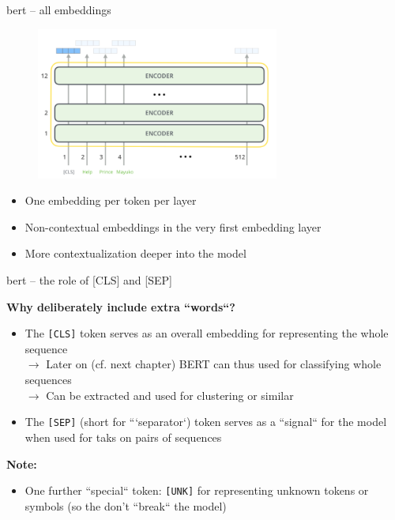 
\begin{frame}{bert -- all embeddings}

\vfill

\begin{figure}
	\centering
	\includegraphics[width = 8cm]{figure/bert-embedings.png}\\ 
\end{figure}

\begin{itemize}
	\item One embedding per token per layer
	\item Non-contextual embeddings in the very first embedding layer
	\item More contextualization deeper into the model
\end{itemize}

\vfill

\end{frame}


\begin{frame}{bert -- the role of [CLS] and [SEP]}

\vfill

\textbf{Why deliberately include extra ``words``?}

\begin{itemize}
	\item The \texttt{[CLS]} token serves as an overall embedding for representing the whole sequence\\
				$\to$ Later on (cf. next chapter) BERT can thus used for classifying whole sequences\\
				$\to$ Can be extracted and used for clustering or similar
	\item The \texttt{[SEP]} (short for ```separator`) token serves as a ``signal`` for the model when used for taks on pairs of sequences
\end{itemize}

\textbf{Note:}

\begin{itemize}
	\item One further ``special`` token: \texttt{[UNK]} for representing unknown tokens or symbols (so the don't ``break`` the model)
\end{itemize}

\vfill

\end{frame}


\endlecture


